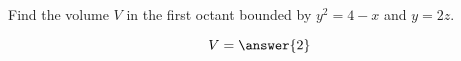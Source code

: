 \documentclass{ximera}
\author{David Guichard \and Neal Koblitz \and H. Jerome Keisler \and Albert Scheller \and Barry Balof \and Mike Wills \and Matthew Carr}
\begin{document}
\begin{exercise}




Find the volume $V$ in the first octant bounded by $y^2=4-x$ and $y=2z$. 
\begin{prompt}
\[
V=\answer{2}
\]
\end{prompt}



\end{exercise}
\end{document}
